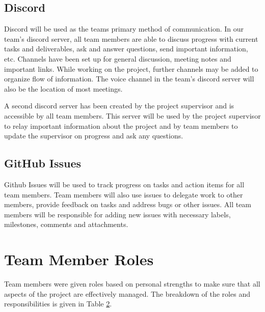 \documentclass{article}
\begin{document}
\subsection{Discord}

Discord will be used as the teams primary method of communication. In our team's discord server, all team members are able to discuss progress with current tasks and deliverables, ask and answer questions, send important information, etc. Channels have been set up for general discussion, meeting notes and important links. While working on the project, further channels may be added to organize flow of information. The voice channel in the team's discord server will also be the location of most meetings.

A second discord server has been created by the project supervisor and is accessible by all team members. This server will be used by the project supervisor to relay important information about the project and by team members to update the supervisor on progress and ask any questions.

\subsection{GitHub Issues}

Github Issues will be used to track progress on tasks and action items for all team members. Team members will also use issues to delegate work to other members, provide feedback on tasks and address bugs or other issues. All team members will be responsible for adding new issues with necessary labels, milestones, comments and attachments.

\section{Team Member Roles}

Team members were given roles based on personal strengths to make sure that all aspects of the project are effectively managed. The breakdown of the roles and responsibilities is given in Table \hyperref[tab:teamRoles]{2}.
\end{document}

